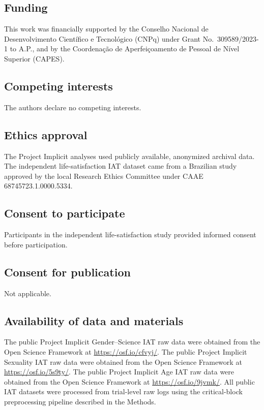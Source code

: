 \documentclass[12pt]{article}
\begin{document}
\subsection*{Funding}
This work was financially supported by the Conselho Nacional de Desenvolvimento Cient\'ifico e Tecnol\'ogico (CNPq) under Grant No.~309589/2023-1 to A.P., and by the Coordena\c{c}\~ao de Aperfei\c{c}oamento de Pessoal de N\'ivel Superior (CAPES).

\subsection*{Competing interests}
The authors declare no competing interests.

\subsection*{Ethics approval}
The Project Implicit analyses used publicly available, anonymized archival data. The independent life-satisfaction IAT dataset came from a Brazilian study approved by the local Research Ethics Committee under CAAE 68745723.1.0000.5334.

\subsection*{Consent to participate}
Participants in the independent life-satisfaction study provided informed consent before participation.

\subsection*{Consent for publication}
Not applicable.

\subsection*{Availability of data and materials}
The public Project Implicit Gender--Science IAT raw data were obtained from the Open Science Framework at \url{https://osf.io/cfvyj/}. The public Project Implicit Sexuality IAT raw data were obtained from the Open Science Framework at \url{https://osf.io/5s9ty/}. The public Project Implicit Age IAT raw data were obtained from the Open Science Framework at \url{https://osf.io/9jvmk/}. All public IAT datasets were processed from trial-level raw logs using the critical-block preprocessing pipeline described in the Methods.
\end{document}

